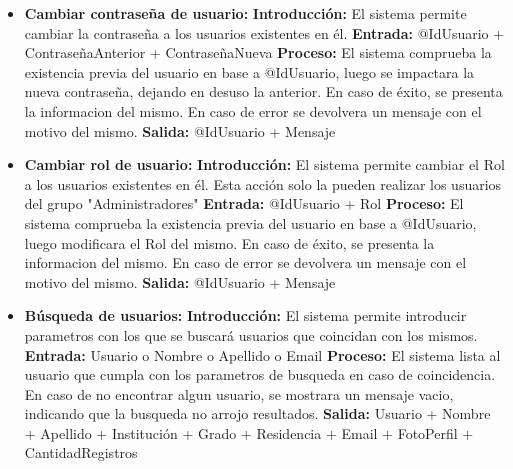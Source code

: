 \begin{enumerate}[A.]
\begin{itemize}
          \item \textbf{Cambiar contraseña de usuario:}
            \tab \textbf{Introducción:} El sistema permite cambiar la contraseña a los usuarios existentes en él.
            \tab \textbf{Entrada:} @IdUsuario + ContraseñaAnterior + ContraseñaNueva
            \tab \textbf{Proceso:} El sistema comprueba la existencia previa del usuario en base a @IdUsuario, luego se impactara la nueva contraseña, dejando en desuso la anterior. En caso de éxito, se presenta la informacion del mismo. En caso de error se devolvera un mensaje con el motivo del mismo.
            \tab \textbf{Salida:} @IdUsuario + Mensaje

          \item \textbf{Cambiar rol de usuario:}
            \tab \textbf{Introducción:} El sistema permite cambiar el Rol a los usuarios existentes en él. Esta acción solo la pueden realizar los usuarios del grupo "Administradores"
            \tab \textbf{Entrada:} @IdUsuario + Rol
            \tab \textbf{Proceso:} El sistema comprueba la existencia previa del usuario en base a @IdUsuario, luego modificara el Rol del mismo. En caso de éxito, se presenta la informacion del mismo. En caso de error se devolvera un mensaje con el motivo del mismo.
            \tab \textbf{Salida:} @IdUsuario + Mensaje

          \item \textbf{Búsqueda de usuarios:}
            \tab \textbf{Introducción:} El sistema permite introducir parametros con los que se buscará usuarios que coincidan con los mismos.
            \tab \textbf{Entrada:} Usuario o Nombre o Apellido o Email
            \tab \textbf{Proceso:} El sistema lista al usuario que cumpla con los parametros de busqueda en caso de coincidencia. En caso de no encontrar algun usuario, se mostrara un mensaje vacio, indicando que la busqueda no arrojo resultados.
            \tab \textbf{Salida:} Usuario + Nombre + Apellido + Institución + Grado + Residencia + Email + FotoPerfil + CantidadRegistros

        \end{itemize}


\end{enumerate}
